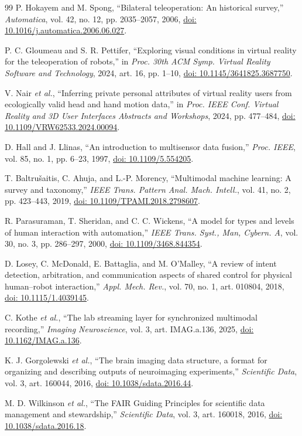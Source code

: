 \documentclass[letterpaper,10pt,conference]{ieeeconf}
\newcommand{\doi}[1]{\href{https://doi.org/#1}{doi: #1}}
\begin{document}
\begin{thebibliography}{99}
P. Hokayem and M. Spong, ``Bilateral teleoperation: An historical survey,'' \emph{Automatica}, vol. 42, no. 12, pp. 2035--2057, 2006, \doi{10.1016/j.automatica.2006.06.027}.

P. C. Gloumeau and S. R. Pettifer, ``Exploring visual conditions in virtual reality for the teleoperation of robots,'' in \emph{Proc. 30th ACM Symp. Virtual Reality Software and Technology}, 2024, art. 16, pp. 1--10, \doi{10.1145/3641825.3687750}.

V. Nair \emph{et al.}, ``Inferring private personal attributes of virtual reality users from ecologically valid head and hand motion data,'' in \emph{Proc. IEEE Conf. Virtual Reality and 3D User Interfaces Abstracts and Workshops}, 2024, pp. 477--484, \doi{10.1109/VRW62533.2024.00094}.

D. Hall and J. Llinas, ``An introduction to multisensor data fusion,'' \emph{Proc. IEEE}, vol. 85, no. 1, pp. 6--23, 1997, \doi{10.1109/5.554205}.

T. Baltru\v{s}aitis, C. Ahuja, and L.-P. Morency, ``Multimodal machine learning: A survey and taxonomy,'' \emph{IEEE Trans. Pattern Anal. Mach. Intell.}, vol. 41, no. 2, pp. 423--443, 2019, \doi{10.1109/TPAMI.2018.2798607}.

R. Parasuraman, T. Sheridan, and C. C. Wickens, ``A model for types and levels of human interaction with automation,'' \emph{IEEE Trans. Syst., Man, Cybern. A}, vol. 30, no. 3, pp. 286--297, 2000, \doi{10.1109/3468.844354}.

D. Losey, C. McDonald, E. Battaglia, and M. O'Malley, ``A review of intent detection, arbitration, and communication aspects of shared control for physical human--robot interaction,'' \emph{Appl. Mech. Rev.}, vol. 70, no. 1, art. 010804, 2018, \doi{10.1115/1.4039145}.

C. Kothe \emph{et al.}, ``The lab streaming layer for synchronized multimodal recording,'' \emph{Imaging Neuroscience}, vol. 3, art. IMAG.a.136, 2025, \doi{10.1162/IMAG.a.136}.

K. J. Gorgolewski \emph{et al.}, ``The brain imaging data structure, a format for organizing and describing outputs of neuroimaging experiments,'' \emph{Scientific Data}, vol. 3, art. 160044, 2016, \doi{10.1038/sdata.2016.44}.

M. D. Wilkinson \emph{et al.}, ``The FAIR Guiding Principles for scientific data management and stewardship,'' \emph{Scientific Data}, vol. 3, art. 160018, 2016, \doi{10.1038/sdata.2016.18}.


\end{thebibliography}
\end{document}
